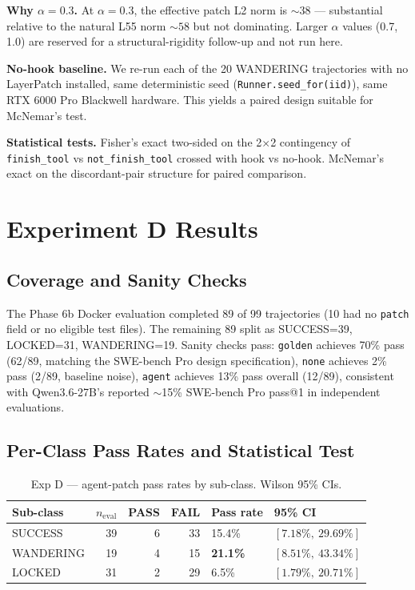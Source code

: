 \documentclass[11pt]{article}
\begin{document}
\textbf{Why $\alpha=0.3$.} At $\alpha=0.3$, the effective patch L2 norm is $\sim 38$ --- substantial relative to the natural L55 norm $\sim 58$ but not dominating. Larger $\alpha$ values (0.7, 1.0) are reserved for a structural-rigidity follow-up and not run here.

\textbf{No-hook baseline.} We re-run each of the 20 WANDERING trajectories with no LayerPatch installed, same deterministic seed (\texttt{Runner.seed\_for(iid)}), same RTX 6000 Pro Blackwell hardware. This yields a paired design suitable for McNemar's test.

\textbf{Statistical tests.} Fisher's exact two-sided on the 2$\times$2 contingency of \texttt{finish\_tool} vs \texttt{not\_finish\_tool} crossed with hook vs no-hook. McNemar's exact on the discordant-pair structure for paired comparison.

\section{Experiment D Results}\label{sec:exp_d_results}

\subsection{Coverage and Sanity Checks}

The Phase 6b Docker evaluation completed 89 of 99 trajectories (10 had no \texttt{patch} field or no eligible test files). The remaining 89 split as SUCCESS=39, LOCKED=31, WANDERING=19. Sanity checks pass: \texttt{golden} achieves 70\% pass (62/89, matching the SWE-bench Pro design specification), \texttt{none} achieves 2\% pass (2/89, baseline noise), \texttt{agent} achieves 13\% pass overall (12/89), consistent with Qwen3.6-27B's reported $\sim$15\% SWE-bench Pro pass@1 in independent evaluations.

\subsection{Per-Class Pass Rates and Statistical Test}

\begin{table}[h]
\centering
\caption{Exp D --- agent-patch pass rates by sub-class. Wilson 95\% CIs.}
\begin{tabular}{lrrrll}
\toprule
Sub-class & $n_{\text{eval}}$ & PASS & FAIL & Pass rate & 95\% CI \\
\midrule
SUCCESS & 39 & 6 & 33 & 15.4\% & $[7.18\%,\ 29.69\%]$ \\
WANDERING & 19 & 4 & 15 & \textbf{21.1\%} & $[8.51\%,\ 43.34\%]$ \\
LOCKED & 31 & 2 & 29 & 6.5\% & $[1.79\%,\ 20.71\%]$ \\
\bottomrule
\end{tabular}
\label{tab:exp_d_pass_rates}
\end{table}
\end{document}

